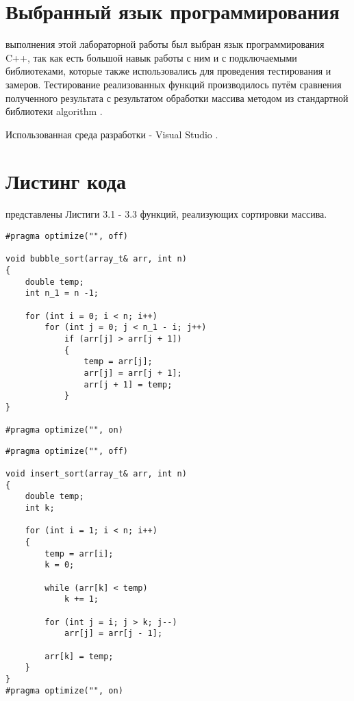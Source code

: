 \section{Выбранный язык программирования}
 выполнения этой лабораторной работы был выбран язык программирования C++, так как есть большой навык работы с ним и с подключаемыми библиотеками, которые также использовались для проведения тестирования и замеров. Тестирование реализованных функций производилось путём сравнения полученного результата с результатом обработки массива методом из стандартной библиотеки algorithm \cite{algorithm}.

Использованная среда разработки - Visual Studio \cite{Visual}.

\section{Листинг кода}
 представлены Листиги 3.1 - 3.3 функций, реализующих сортировки массива.
\begin{lstlisting}[label=code, caption = Сортировка пузырьком]
#pragma optimize("", off)

void bubble_sort(array_t& arr, int n)
{
	double temp;
	int n_1 = n -1;
	
	for (int i = 0; i < n; i++)
		for (int j = 0; j < n_1 - i; j++)
			if (arr[j] > arr[j + 1])
			{
				temp = arr[j];
				arr[j] = arr[j + 1];
				arr[j + 1] = temp;
			}
}

#pragma optimize("", on)
\end{lstlisting}

\begin{lstlisting}[label=code, caption = Сортировка вставками]
#pragma optimize("", off)

void insert_sort(array_t& arr, int n)
{
	double temp;
	int k;
	
	for (int i = 1; i < n; i++)
	{
		temp = arr[i];
		k = 0;
		
		while (arr[k] < temp)
			k += 1;
		
		for (int j = i; j > k; j--)
			arr[j] = arr[j - 1];
		
		arr[k] = temp;
	}
}
#pragma optimize("", on)
\end{lstlisting}

